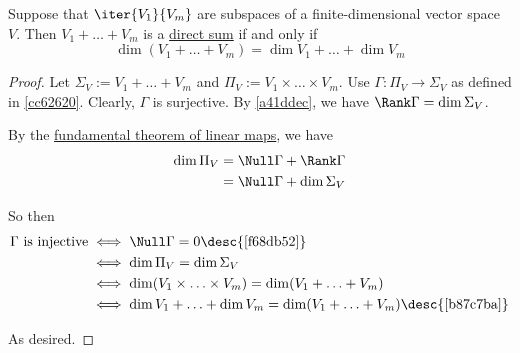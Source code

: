 \label{c6195b4}

Suppose that $\iter{V_1}{V_m}$ are subspaces of a finite-dimensional vector
space $V$. Then $V_1+\ldots+V_m$ is a \href{c67c961}{direct sum} if and only if
$$
  \dim(V_1+\ldots+V_m)=\dim V_1+\ldots+\dim V_m
$$

\begin{proof}
  \def\S{\Sigma_V}
  \def\P{\Pi_V}

  Let $\S:=V_1+\ldots+V_m$ and $\P:=V_1\times\ldots\times V_m$. Use
  $\Gamma:\P\to\S$ as defined in \autoref{cc62620}. Clearly, $\Gamma$ is
  surjective. By \autoref{a41ddec}, we have $\Rank\Gamma=\dim\S$.

  By the \href{e83dffc}{fundamental theorem of linear maps}, we have
  \begin{align*}
    \dim\P &=\Null\Gamma+\Rank\Gamma \\
           &=\Null\Gamma+\dim\S
  \end{align*}

  So then
  \begin{align*}
    \Gamma\text{ is injective}
     &\iff\Null\Gamma=0\desc{\autoref{f68db52}}                                 \\
     &\iff\dim\P=\dim\S                                                         \\
     &\iff\dim(V_1\times\ldots\times V_m)=\dim(V_1+\ldots+V_m)                  \\
     &\iff\dim V_1+\ldots+\dim V_m=\dim(V_1+\ldots+V_m)\desc{\autoref{b87c7ba}}
  \end{align*}

  As desired.
\end{proof}
